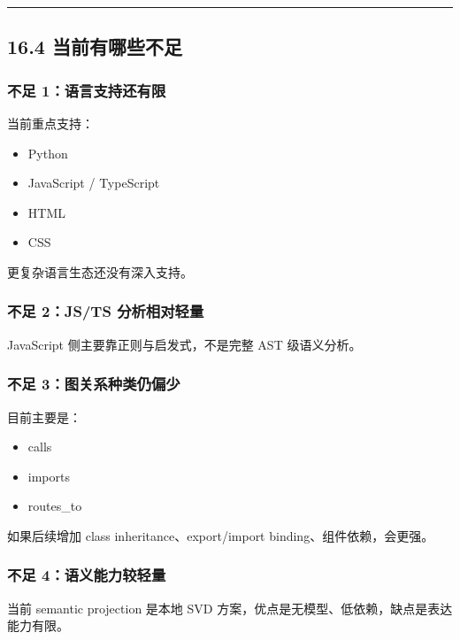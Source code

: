 \documentclass[UTF8,12pt,openany]{ctexbook}
\begin{document}
\hrule

\subsection{16.4 当前有哪些不足}

\subsubsection{不足 1：语言支持还有限}

当前重点支持：\par

\begin{itemize}
\item Python
\item JavaScript / TypeScript
\item HTML
\item CSS
\end{itemize}

更复杂语言生态还没有深入支持。\par

\subsubsection{不足 2：JS/TS 分析相对轻量}

JavaScript 侧主要靠正则与启发式，不是完整 AST 级语义分析。\par

\subsubsection{不足 3：图关系种类仍偏少}

目前主要是：\par

\begin{itemize}
\item calls
\item imports
\item routes\_to
\end{itemize}

如果后续增加 class inheritance、export/import binding、组件依赖，会更强。\par

\subsubsection{不足 4：语义能力较轻量}

当前 semantic projection 是本地 SVD 方案，优点是无模型、低依赖，缺点是表达能力有限。\par
\end{document}
